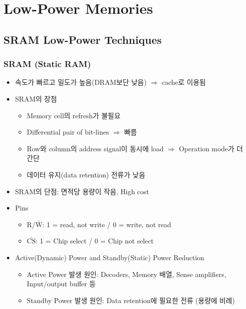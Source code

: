 \section{Low-Power Memories}

\subsection{SRAM Low-Power Techniques}

\subsubsection*{SRAM (Static RAM)}
\begin{itemize}
    \item 속도가 빠르고 밀도가 높음(DRAM보단 낮음) $\Rightarrow$ cache로 이용됨
    \item SRAM의 장점
    \begin{itemize}
        \item Memory cell의 refresh가 불필요
        \item Differential pair of bit-lines $\Rightarrow$ 빠름
        \item Row와 column의 address signal이 동시에 load $\Rightarrow$ Operation mode가 더 간단
        \item 데이터 유지(data retention) 전류가 낮음
    \end{itemize}
    \item SRAM의 단점: 면적당 용량이 작음, High cost
    \item Pins
    \begin{itemize}
        \item $\mathrm{R/\bar{W}}$: 1 = read, not write / 0 = write, not read
        \item $\mathrm{\bar{CS}}$: 1 = Chip select / 0 = Chip not select
    \end{itemize}
    \item Active(Dynamic) Power and Standby(Static) Power Reduction
    \begin{itemize}
        \item Active Power 발생 원인: Decoders, Memory 배열, Sense amplifiers, Input/output buffer 등
        \item Standby Power 발생 원인: Data retention에 필요한 전류 (용량에 비례)
    \end{itemize}
\end{itemize}

